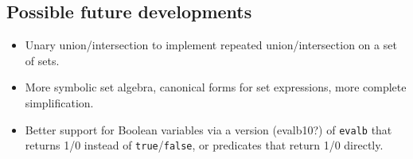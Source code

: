 \subsection{Possible future developments}

\begin{itemize}
\item Unary union/intersection to implement repeated
  union/intersection on a set of sets.
\item More symbolic set algebra, canonical forms for set expressions,
  more complete simplification.
\item Better support for Boolean variables via a version (evalb10?)
  of {\tt evalb} that returns 1/0 instead of {\tt true}/{\tt false},
  or predicates that return 1/0 directly.
\end{itemize}
